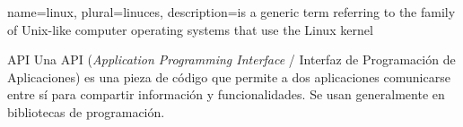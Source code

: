 {
	name=linux, %
    plural=linuces,
	description={is a generic term referring to the family of Unix-like
		computer operating systems that use the Linux kernel}	
}



{API} %
{Una API (\textit{Application Programming Interface} / Interfaz de Programación de Aplicaciones) es una pieza de código que permite a dos aplicaciones comunicarse entre sí para compartir información y funcionalidades. Se usan generalmente en bibliotecas de programación.}



